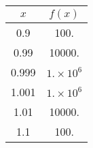 \begin{tabular}{cc}
$x$ & $f(x)$ \\ \hline
 0.9 & 100. \\
 0.99 & 10000. \\
 0.999 & $1.\times 10^6$ \\
 1.001 & $1.\times 10^6$ \\
 1.01 & 10000. \\
 1.1 & 100.
\end{tabular}